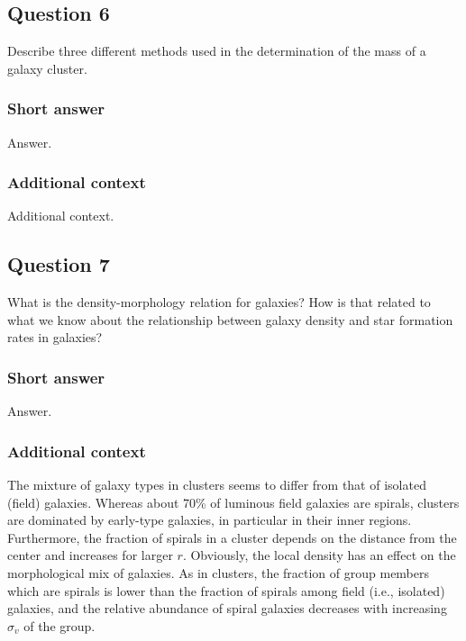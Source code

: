 \documentclass[a4paper,11pt]{article}
\begin{document}

\newpage
\subsection{Question 6}

Describe three different methods used in the determination of the mass of a galaxy cluster.

\subsubsection{Short answer}

Answer.

\subsubsection{Additional context}

Additional context.


\newpage
\subsection{Question 7}

What is the density-morphology relation for galaxies? How is that related to what we know about the relationship between galaxy density and star formation rates in galaxies?

\subsubsection{Short answer}

Answer.

\subsubsection{Additional context}

The mixture of galaxy types in clusters seems to differ from that of isolated (field) galaxies. Whereas about 70\% of luminous field galaxies are spirals, clusters are dominated by early-type galaxies, in particular in their inner regions. Furthermore, the fraction of spirals in a cluster depends on the distance from the center and increases for larger $r$. Obviously, the local density has an effect on the morphological mix of galaxies. As in clusters, the fraction of group members which are spirals is lower than the fraction of spirals among field (i.e., isolated) galaxies, and the relative abundance of spiral galaxies decreases with increasing $\sigma_v$ of the group.
\end{document}
